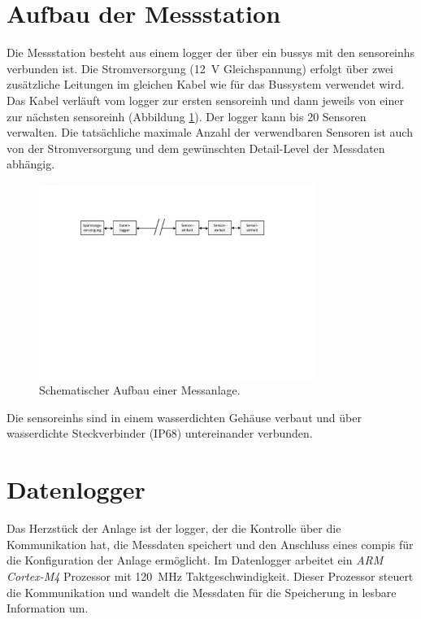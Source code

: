 \section{Aufbau der Messstation}\label{sec.manualoverview}
Die Messstation besteht aus einem \gls{logger} der über ein \gls{bussys} mit den \glspl{sensoreinh} verbunden ist. Die Stromversorgung (12~V Gleichspannung) erfolgt über zwei zusätzliche Leitungen im gleichen Kabel wie für das Bussystem verwendet wird. Das Kabel verläuft vom \gls{logger} zur ersten \gls{sensoreinh} und dann jeweils von einer zur nächsten \gls{sensoreinh} (Abbildung \ref{fig.schemamessanlage}). Der \gls{logger} kann bis 20 Sensoren verwalten. Die tatsächliche maximale Anzahl der verwendbaren Sensoren ist auch von der Stromversorgung und dem gewünschten Detail-Level der Messdaten abhängig.

\begin{figure}
	\centering
		\includegraphics[width=0.8\textwidth]{images/visio/schemaMessanlage.pdf}
	\caption{Schematischer Aufbau einer Messanlage.}
	\label{fig.schemamessanlage}
\end{figure}

Die \glspl{sensoreinh} sind in einem wasserdichten Gehäuse verbaut und über wasserdichte Steckverbinder (IP68) untereinander verbunden. 










\section{Datenlogger}\label{sec.manuallogger}
Das Herzstück der Anlage ist der \gls{logger}, der die Kontrolle über die Kommunikation hat, die Messdaten speichert und den Anschluss eines \gls{compi}s für die Konfiguration der Anlage ermöglicht. Im Datenlogger arbeitet ein \emph{ARM Cortex-M4} Prozessor mit 120~MHz Taktgeschwindigkeit. Dieser Prozessor steuert die Kommunikation und wandelt die Messdaten für die Speicherung in lesbare Information um.

